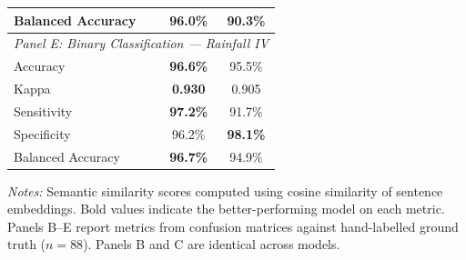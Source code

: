 \begin{table}[htbp]
\begin{tabular}{lcc}
Balanced Accuracy   & \textbf{96.0\%} & 90.3\% \\
\midrule
\multicolumn{3}{l}{\textit{Panel E: Binary Classification — Rainfall IV}} \\
\midrule
Accuracy            & \textbf{96.6\%} & 95.5\% \\
Kappa               & \textbf{0.930}  & 0.905  \\
Sensitivity         & \textbf{97.2\%} & 91.7\% \\
Specificity         & 96.2\% & \textbf{98.1\%} \\
Balanced Accuracy   & \textbf{96.7\%} & 94.9\% \\
\bottomrule
\end{tabular}
\begin{tablenotes}
\small
\item \textit{Notes:} Semantic similarity scores computed using cosine similarity of sentence embeddings.
Bold values indicate the better-performing model on each metric.
Panels B--E report metrics from confusion matrices against hand-labelled ground truth ($n = 88$).
Panels B and C are identical across models.
\end{tablenotes}
\end{table}
